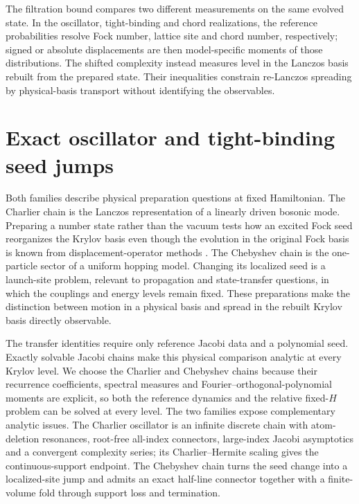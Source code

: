 \documentclass[a4paper,11pt]{article}
\theoremstyle{definition}
\theoremstyle{remark}
\begin{document}
The filtration bound compares two different measurements on the same evolved state.
In the oscillator, tight-binding and chord realizations, the reference probabilities resolve
Fock number, lattice site and chord number, respectively; signed or absolute displacements are
then model-specific moments of those distributions.  The shifted complexity instead measures
level in the Lanczos basis rebuilt from the prepared state.  Their inequalities constrain
re-Lanczos spreading by physical-basis transport without identifying the observables.

\section{Exact oscillator and tight-binding seed jumps}
\label{sec:examples}

Both families describe physical preparation questions at fixed Hamiltonian.  The Charlier
chain is the Lanczos representation of a linearly driven bosonic mode.  Preparing a number state
rather than the vacuum tests how an excited Fock seed reorganizes the Krylov basis even though the
evolution in the original Fock basis is known from displacement-operator methods
\cite{Perelomov1986}.  The Chebyshev chain is the one-particle sector of a uniform hopping model.
Changing its localized seed is a launch-site problem, relevant to propagation and state-transfer
questions, in which the couplings and energy levels remain fixed.  These preparations make the
distinction between motion in a physical basis and spread in the rebuilt Krylov basis directly
observable.

The transfer identities require only reference Jacobi data and a polynomial seed.  Exactly solvable Jacobi chains make this physical comparison
analytic at every Krylov level.  We choose the
Charlier and Chebyshev chains because their recurrence coefficients, spectral measures and
Fourier--orthogonal-polynomial moments are explicit,
so both the reference dynamics and the relative fixed-$H$ problem can be solved
at every level.  The two families expose
complementary analytic issues.  The Charlier oscillator is an infinite discrete chain with
atom-deletion resonances, root-free all-index connectors, large-index Jacobi asymptotics and a
convergent complexity series; its Charlier--Hermite scaling gives the continuous-support endpoint.
The Chebyshev chain turns the seed change into a localized-site jump and admits an exact half-line
connector together with a finite-volume fold through support loss and termination.
\end{document}
